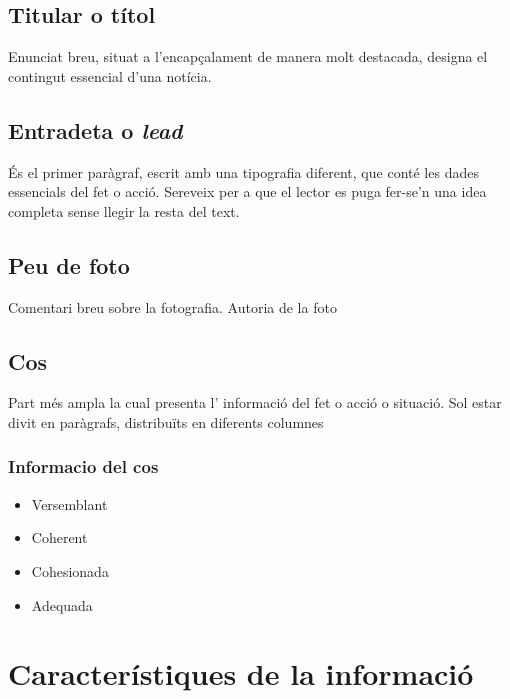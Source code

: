 \documentclass[
]{article}
\providecommand{\tightlist}{%
  \setlength{\itemsep}{0pt}\setlength{\parskip}{0pt}}
\begin{document}
\hypertarget{titular-o-tuxedtol}{%
\subsection{Titular o títol}\label{titular-o-tuxedtol}}

Enunciat breu, situat a l'encapçalament de manera molt destacada,
designa el contingut essencial d'una notícia.

\hypertarget{entradeta-o-lead}{%
\subsection{\texorpdfstring{Entradeta o
\emph{lead}}{Entradeta o lead}}\label{entradeta-o-lead}}

És el primer paràgraf, escrit amb una tipografia diferent, que conté les
dades essencials del fet o acció. Sereveix per a que el lector es puga
fer-se'n una idea completa sense llegir la resta del text.

\hypertarget{peu-de-foto}{%
\subsection{Peu de foto}\label{peu-de-foto}}

Comentari breu sobre la fotografia. Autoria de la foto

\hypertarget{cos}{%
\subsection{Cos}\label{cos}}

Part més ampla la cual presenta l' informació del fet o acció o
situació. Sol estar divit en paràgrafs, distribuïts en diferents
columnes

\hypertarget{informacio-del-cos}{%
\subsubsection{Informacio del cos}\label{informacio-del-cos}}

\begin{itemize}
\tightlist
\item
  Versemblant
\item
  Coherent
\item
  Cohesionada
\item
  Adequada
\end{itemize}

\hypertarget{caracteruxedstiques-de-la-informaciuxf3}{%
\section{Característiques de la
informació}\label{caracteruxedstiques-de-la-informaciuxf3}}
\end{document}

